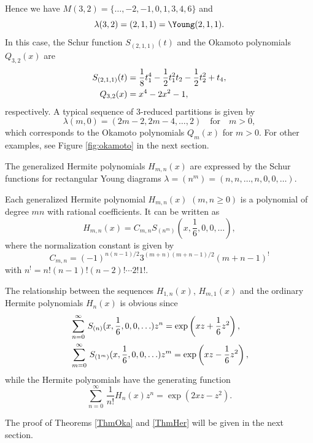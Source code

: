 Hence we have $M(3,2)=\{\ldots,-2,-1,0,1,3,4,6\}$ and 
\begin{equation}
\lambda(3,2)=(2,1,1)={\Young(2,1,1)}.
\end{equation}
In this case, the Schur function $S_{(2,1,1)}(t)$ and the Okamoto polynomials 
$Q_{3,2}(x)$ are 
\begin{equation}
\begin{align} 
S_{(2,1,1)}(t)&=\frac{1}{8}t_1^4- \frac{1}{2} t_1^2 t_2 - \frac{1}{2} t_2^2 + t_4,
\\
Q_{3,2}(x)&=x^4-2x^2-1,\notag
\end{align}
\end{equation}
respectively. 
A typical sequence of 3-reduced partitions is given by 
\begin{equation}
\lambda(m,0)=(2m-2,2m-4,\ldots,2)\quad \mbox{for}\quad m>0,
\end{equation}
which corresponds to the Okamoto polynomials $Q_m(x)$  for $m>0$. 
For other examples, see Figure \ref{fig:okamoto} in the next section. 

\par\medskip
The generalized Hermite polynomials $H_{m,n}(x)$ 
are expressed by the Schur functions for rectangular Young diagrams 
$\lambda=(n^m)=(n,n,\ldots,n,0,0,\ldots)$. 
\begin{thm}\label{ThmHer}
Each generalized Hermite polynomial $H_{m,n}(x)$ $(m,n\ge 0)$ is 
a polynomial of degree $mn$ with rational coefficients. 
It can be written as 
\begin{equation}
H_{m,n}(x)=C_{m,n} S_{(n^m)}(x,\frac{1}{6},0,0,\ldots),
\end{equation}
where the normalization constant is given by
\begin{equation} 
C_{m,n}=(-1)^{n(n-1)/2} 3^{(m+n)(m+n-1)/2}(m+n-1)^!
\end{equation}
with $n^!=n!(n-1)!(n-2)!\cdots 2! 1!$.
\end{thm}
\noindent
The relationship between the sequences $H_{1,n}(x)$, $H_{m,1}(x)$ 
and the ordinary Hermite polynomials $H_n(x)$ is obvious since 
\begin{equation}
\begin{align}
&\sum_{n=0}^\infty \, S_{(n)}(x,\frac{1}{6},0,0,\ldots) z^n =
\exp\left(x z +\frac{1}{6} z^2 \right),\\
&\sum_{m=0}^\infty \, S_{(1^m)}(x,\frac{1}{6},0,0,\ldots) z^m =
\exp\left(x z -\frac{1}{6} z^2 \right),\notag
\end{align}
\end{equation}
while the Hermite polynomials have the generating function
\begin{equation}
\sum_{n=0}^\infty \, \frac{1}{n!} H_n(x) z^n = \exp\left(2xz - z^2 \right).
\end{equation}
\par\medskip
The proof of Theorems \ref{ThmOka} and \ref{ThmHer} will be given in the 
next section. 

